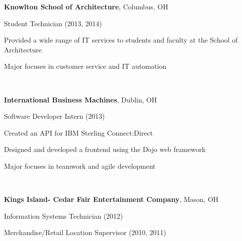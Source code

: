 \documentclass[letterpaper]{resume}
\begin{document}
\textbf{Knowlton School of Architecture}, Columbus, OH

Student Technician (2013, 2014)
\begin{compactitem}
\item Provided a wide range of IT services to students and faculty at the
	School of Architecture


\item Major focuses in customer service and IT automation
\end{compactitem}

~

\textbf{International Business Machines}, Dublin, OH

Software Developer Intern (2013)
\begin{compactitem}
\item Created an API for IBM Sterling Connect:Direct

\item Designed and developed a frontend using the Dojo web framework


\item Major focuses in teamwork and agile development
\end{compactitem}

~

\textbf{Kings Island- Cedar Fair Entertainment Company}, Mason, OH

Information Systems Technician (2012)
%
%
%

Merchandise/Retail Location Supervisor (2010, 2011)

%
\end{document}
